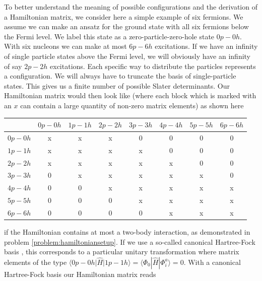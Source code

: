   To better understand the meaning of possible configurations and the
  derivation of a Hamiltonian matrix, we consider here a simple
  example of six fermions. We assume we can make an ansatz for the
  ground state with all six fermions below the Fermi level. We 
  label this state as a zero-particle-zero-hole state $0p-0h$. With
  six nucleons we can make at most $6p-6h$ excitations. If we have an
  infinity of single particle states above the Fermi level, we will
  obviously have an infinity of say $2p-2h$ excitations. Each specific way
  to distribute the particles represents a configuration. We will
  always have to truncate  the basis of single-particle states.
  This gives us a finite number of possible Slater determinants. Our
  Hamiltonian matrix would then look like (where each block which is
  marked with an $x$ can contain a large quantity of non-zero matrix
  elements) as shown here
  \begin{table}[h]
  \begin{center}
  \begin{tabular}{cccccccc}
  \hline \multicolumn{1}{c}{ } & \multicolumn{1}{c}{ $0p-0h$ } &
  \multicolumn{1}{c}{ $1p-1h$ } & \multicolumn{1}{c}{ $2p-2h$ } &
  \multicolumn{1}{c}{ $3p-3h$ } & \multicolumn{1}{c}{ $4p-4h$ } &
  \multicolumn{1}{c}{ $5p-5h$ } & \multicolumn{1}{c}{ $6p-6h$ }
  \\ \hline $0p-0h$ & x & x & x & 0 & 0 & 0 & 0 \\ $1p-1h$ & x & x & x
  & x & 0 & 0 & 0 \\ $2p-2h$ & x & x & x & x & x & 0 & 0 \\ $3p-3h$ &
  0 & x & x & x & x & x & 0 \\ $4p-4h$ & 0 & 0 & x & x & x & x & x
  \\ $5p-5h$ & 0 & 0 & 0 & x & x & x & x \\ $6p-6h$ & 0 & 0 & 0 & 0 &
  x & x & x \\ \hline
  \end{tabular}
  \end{center}
  \end{table}
  if the Hamiltonian contains at most a two-body interaction, as
  demonstrated in problem \ref{problem:hamiltoniansetup}.  If we use a
  so-called canonical Hartree-Fock basis \cite{shavittbartlett2009}, this corresponds to a particular unitary
  transformation where matrix elements of the type 
$\langle 0p-0h\vert \hat{H} \vert 1p-1h\rangle =\langle \Phi_0 |\hat{H}|\Phi_{i}^{a}\rangle=0$.
With a canonical Hartree-Fock basis our Hamiltonian matrix reads
